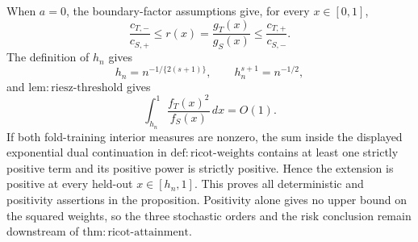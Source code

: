 When \(a=0\), the boundary-factor assumptions give, for every \(x\in[0,1]\),
\[
\frac{c_{T,-}}{c_{S,+}}\le r(x)=\frac{g_T(x)}{g_S(x)}\le\frac{c_{T,+}}{c_{S,-}}.
\]
The definition of \(h_n\) gives
\[
h_n=n^{-1/\{2(s+1)\}},\qquad h_n^{s+1}=n^{-1/2},
\]
and \(\mathrm{lem:riesz\text{-}threshold}\) gives
\[
\int_{h_n}^1\frac{f_T(x)^2}{f_S(x)}\,dx=O(1).
\]
If both fold-training interior measures are nonzero, the sum inside the displayed exponential dual continuation in \(\mathrm{def:ricot\text{-}weights}\) contains at least one strictly positive term and its positive power is strictly positive. Hence the extension is positive at every held-out \(x\in[h_n,1]\). This proves all deterministic and positivity assertions in the proposition. Positivity alone gives no upper bound on the squared weights, so the three stochastic orders and the risk conclusion remain downstream of \(\mathrm{thm:ricot\text{-}attainment}\).